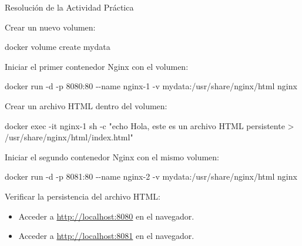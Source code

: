 \documentclass[
  a4paper,
  DIV=11,
  numbers=noendperiod,
  onepage,
  openany]{scrreprt}
\newenvironment{Shaded}{\begin{snugshade}}{\end{snugshade}}
\newcommand{\AttributeTok}[1]{\textcolor[rgb]{0.40,0.45,0.13}{#1}}
\newcommand{\ExtensionTok}[1]{\textcolor[rgb]{0.00,0.23,0.31}{#1}}
\newcommand{\NormalTok}[1]{\textcolor[rgb]{0.00,0.23,0.31}{#1}}
\newcommand{\StringTok}[1]{\textcolor[rgb]{0.13,0.47,0.30}{#1}}
\providecommand{\tightlist}{%
  \setlength{\itemsep}{0pt}\setlength{\parskip}{0pt}}\usepackage{longtable,booktabs,array}
\begin{document}
Resolución de la Actividad Práctica

Crear un nuevo volumen:

\begin{Shaded}
\begin{Highlighting}[]
\ExtensionTok{docker}\NormalTok{ volume create mydata}
\end{Highlighting}
\end{Shaded}

Iniciar el primer contenedor Nginx con el volumen:

\begin{Shaded}
\begin{Highlighting}[]
\ExtensionTok{docker}\NormalTok{ run }\AttributeTok{{-}d} \AttributeTok{{-}p}\NormalTok{ 8080:80 }\AttributeTok{{-}{-}name}\NormalTok{ nginx{-}1 }\AttributeTok{{-}v}\NormalTok{ mydata:/usr/share/nginx/html nginx}
\end{Highlighting}
\end{Shaded}

Crear un archivo HTML dentro del volumen:

\begin{Shaded}
\begin{Highlighting}[]
\ExtensionTok{docker}\NormalTok{ exec }\AttributeTok{{-}it}\NormalTok{ nginx{-}1 sh }\AttributeTok{{-}c} \StringTok{"echo \textquotesingle{}Hola, este es un archivo HTML persistente\textquotesingle{} \textgreater{} /usr/share/nginx/html/index.html"}
\end{Highlighting}
\end{Shaded}

Iniciar el segundo contenedor Nginx con el mismo volumen:

\begin{Shaded}
\begin{Highlighting}[]
\ExtensionTok{docker}\NormalTok{ run }\AttributeTok{{-}d} \AttributeTok{{-}p}\NormalTok{ 8081:80 }\AttributeTok{{-}{-}name}\NormalTok{ nginx{-}2 }\AttributeTok{{-}v}\NormalTok{ mydata:/usr/share/nginx/html nginx}
\end{Highlighting}
\end{Shaded}

Verificar la persistencia del archivo HTML:

\begin{itemize}
\tightlist
\item
  Acceder a \url{http://localhost:8080} en el navegador.
\item
  Acceder a \url{http://localhost:8081} en el navegador.
\end{itemize}
\end{document}
